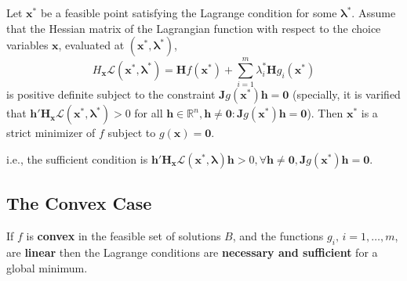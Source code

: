 \begin{proposition}
    Let $\mathbf{x ^{*}}$ be a feasible point satisfying the Lagrange condition for some $\boldsymbol{\lambda ^{*}}$. Assume that the Hessian matrix of the Lagrangian function with respect to the choice variables $\mathbf{x}$, evaluated at $(\mathbf{x ^{*}, \lambda ^{*}})$,
    \[
        H_\mathbf{x}\mathcal{L}(\mathbf{x ^{*}}, \boldsymbol{\lambda ^{*}}) = \mathbf{H}f(\mathbf{x ^{*}}) + \sum_{i=1}^{m} \lambda_i ^{*}\mathbf{H}g_i(\mathbf{x ^{*}})
    \]
    is positive definite subject to the constraint $\mathbf{J}g(\mathbf{x ^{*}})\mathbf{h} = \mathbf{0}$ (specially, it is varified that $\mathbf{h'H_x\mathcal{L}(\mathbf{x ^{*}, \boldsymbol{\lambda ^{*}}})} > 0$ for all $\mathbf{h} \in  \mathbb{R}^{n}, \mathbf{h \neq 0}: \mathbf{J}g(\mathbf{x ^{*}})\mathbf{h} = \mathbf{0}$). Then $\mathbf{x}^{*}$ is a strict minimizer of $f$ subject to $g(\mathbf{x}) = \mathbf{0}$.
\end{proposition}

\begin{remark*}
    i.e., the sufficient condition is $\mathbf{h'}\mathbf{H_x}\mathcal{L}(\mathbf{x ^{*}}, \boldsymbol{\lambda})\mathbf{h} > 0, \forall \mathbf{h \neq 0}, \mathbf{J}g(\mathbf{x ^{*}})\mathbf{h} = \mathbf{0}$.
\end{remark*}

\subsection{The Convex Case}

\begin{proposition}
    If $f$ is \textbf{convex} in the feasible set of solutions $B$, and the functions $g_i, \, i=1,\dots,m$, are \textbf{linear} then the Lagrange conditions are \textbf{necessary and sufficient} for a global minimum.
\end{proposition}

